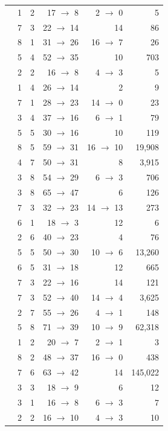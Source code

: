 \begin{longtable}{@{}L{4.4cm} r r r r r@{}}
 & 1 & 2 & 17 $\to$ 8 & 2 $\to$ 0 & 5 \\
 & 7 & 3 & 22 $\to$ 14 & 14 & 86 \\
 & 8 & 1 & 31 $\to$ 26 & 16 $\to$ 7 & 26 \\
 & 5 & 4 & 52 $\to$ 35 & 10 & 703 \\
 & 2 & 2 & 16 $\to$ 8 & 4 $\to$ 3 & 5 \\
 & 1 & 4 & 26 $\to$ 14 & 2 & 9 \\
 & 7 & 1 & 28 $\to$ 23 & 14 $\to$ 0 & 23 \\
 & 3 & 4 & 37 $\to$ 16 & 6 $\to$ 1 & 79 \\
 & 5 & 5 & 30 $\to$ 16 & 10 & 119 \\
 & 8 & 5 & 59 $\to$ 31 & 16 $\to$ 10 & 19,908 \\
 & 4 & 7 & 50 $\to$ 31 & 8 & 3,915 \\
 & 3 & 8 & 54 $\to$ 29 & 6 $\to$ 3 & 706 \\
 & 3 & 8 & 65 $\to$ 47 & 6 & 126 \\
 & 7 & 3 & 32 $\to$ 23 & 14 $\to$ 13 & 273 \\
 & 6 & 1 & 18 $\to$ 3 & 12 & 6 \\
 & 2 & 6 & 40 $\to$ 23 & 4 & 76 \\
 & 5 & 5 & 50 $\to$ 30 & 10 $\to$ 6 & 13,260 \\
 & 6 & 5 & 31 $\to$ 18 & 12 & 665 \\
 & 7 & 3 & 22 $\to$ 16 & 14 & 121 \\
 & 7 & 3 & 52 $\to$ 40 & 14 $\to$ 4 & 3,625 \\
 & 2 & 7 & 55 $\to$ 26 & 4 $\to$ 1 & 148 \\
 & 5 & 8 & 71 $\to$ 39 & 10 $\to$ 9 & 62,318 \\
 & 1 & 2 & 20 $\to$ 7 & 2 $\to$ 1 & 3 \\
 & 8 & 2 & 48 $\to$ 37 & 16 $\to$ 0 & 438 \\
 & 7 & 6 & 63 $\to$ 42 & 14 & 145,022 \\
 & 3 & 3 & 18 $\to$ 9 & 6 & 12 \\
 & 3 & 1 & 16 $\to$ 8 & 6 $\to$ 3 & 7 \\
 & 2 & 2 & 16 $\to$ 10 & 4 $\to$ 3 & 10 \\

\end{longtable}
